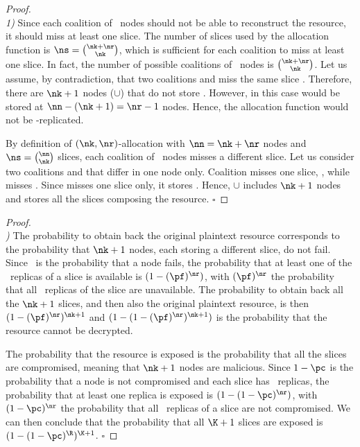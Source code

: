 \medskip

\begin{proof}
	\hfill\\
	{\em 1)\/} Since each coalition of \nk\ nodes should not be able to
	reconstruct the resource, it should miss at least one slice. The
	number of slices used by the allocation function is
	$\ns=\binom{\nk+\nr}{\nk}$, which is sufficient for each coalition to
	miss at least one slice. In fact, the number of possible coalitions of
	\nk\ nodes is $\binom{\nk+\nr}{\nk}$. Let us assume, by contradiction,
	that two coalitions  and  miss the same slice
	. Therefore, there are $\nk+1$ nodes
	($\cup$) that do not store . However,
	in this case  would be stored at $\nn - (\nk +1)=\nr-1$
	nodes. Hence, the allocation function would not be
	\nr-replicated.
	
	\medskip
	
	 By definition of
	$(\nk,\nr)$-allocation with $\nn = \nk+\nr$ nodes and
	$\ns=\binom{\nn}{\nk}$ slices, each coalition of \nk\ nodes misses a
	different slice. Let  us consider two coalitions  and
	  that differ in one node only. Coalition 
	misses one slice, , while  misses . Since
	 misses one slice only, it stores . Hence,
	$\cup$ includes $\nk+1$ nodes and stores all the
	slices composing the resource.
	{\hfill $\square$}
\end{proof}

\medskip

\begin{proof}
	\hfill\\
	{\em \PF)\/} The probability to obtain back the original plaintext resource
	corresponds to the probability that $\nk+1$ nodes, each storing a
	different slice, do not fail. Since \pf\ is the probability that a
	node fails, the probability that at least one of the \nr\ replicas of
	a slice is available is $(1-(\pf)^{\nr})$, with $(\pf)^{\nr}$ the
	probability that all \nr\ replicas of the slice are unavailable. 
	The probability to obtain back all the $\nk+1$ slices, 
	and then also the original plaintext resource, is then
	$(1-(\pf)^{\nr})^{\nk+1}$ and $(1-(1-(\pf)^{\nr})^{\nk+1})$ is the
	probability that the resource cannot be decrypted.
	
	\medskip
	
	\noindent {\em  \PC)\/} The probability that the resource is exposed 
	is the probability that all the slices are
	compromised, meaning that $\nk+1$ nodes are malicious.
	Since $1-\pc$ is the probability that a node is not compromised and
	each slice has \nr\ replicas, the probability that at least one
	replica is exposed is $(1-(1-\pc)^{\nr})$, with
	$(1-\pc)^{\nr}$ the probability that all \nr\ replicas of a slice
	are not compromised. We can then conclude that the probability that
	all $\K+1$ slices are exposed is $(1 - (1-\pc)^{\R})^{\K+1}$.
	{\hfill $\square$}
\end{proof}

